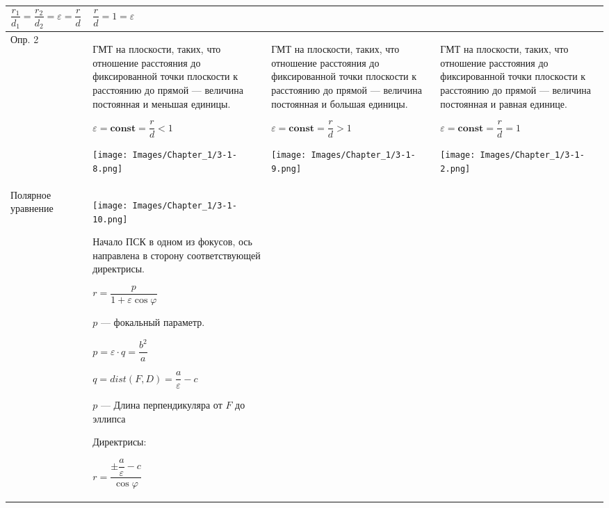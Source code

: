 \begin{center}
\begin{longtable}{|p{2.5cm}|p{4.5cm}|p{4.5cm}|p{4.5cm}|}
        \(\dfrac{r_1}{d_1} = \dfrac{r_2}{d_2} = \varepsilon = \dfrac{r}{d}\)
         &
        \(\dfrac{r}{d} = 1 = \varepsilon\)
        \\
        \hline
        Опр. 2
         &
        ГМТ на плоскости, таких, что отношение расстояния до фиксированной точки плоскости к расстоянию до прямой --- величина постоянная и меньшая единицы.

        \(\varepsilon = \mathbf{const} = \dfrac{r}{d} < 1\)
        \begin{center}
            \texttt{[image: Images/Chapter\_1/3-1-8.png]}
        \end{center}
         &
        ГМТ на плоскости, таких, что отношение расстояния до фиксированной точки плоскости к расстоянию до прямой --- величина постоянная и большая единицы.

        \(\varepsilon = \mathbf{const} = \dfrac{r}{d} > 1\)
        \begin{center}
            \texttt{[image: Images/Chapter\_1/3-1-9.png]}
        \end{center}
         &
        ГМТ на плоскости, таких, что отношение расстояния до фиксированной точки плоскости к расстоянию до прямой --- величина постоянная и равная единице.

        \(\varepsilon = \mathbf{const} = \dfrac{r}{d} = 1\)
        \begin{center}
            \texttt{[image: Images/Chapter\_1/3-1-2.png]}
        \end{center}
        \\
        \hline
        Полярное уравнение
         &
        \begin{center}
            \texttt{[image: Images/Chapter\_1/3-1-10.png]}
        \end{center}
        Начало ПСК в одном из фокусов, ось направлена в сторону соответствующей директрисы.

        \(r = \dfrac{p}{1 + \varepsilon \cos\varphi}\)

        \(p\) --- фокальный параметр.

        \(p = \varepsilon \cdot q = \dfrac{b^2}{a}\)

        \(q = dist(F, D) = \dfrac{a}{\varepsilon} - c\)

        \(p\) --- Длина перпендикуляра от \(F\) до эллипса

        Директрисы:

        \(r = \dfrac{\pm \dfrac{a}{\varepsilon} - c}{\cos\varphi}\)


\end{longtable}
\end{center}
